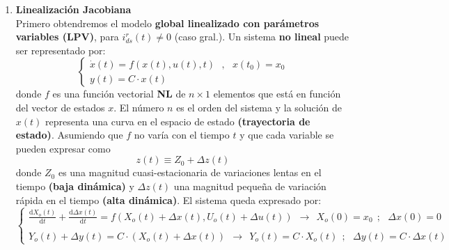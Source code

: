 \documentclass[10pt]{article}
\begin{document}
\begin{enumerate}
	\item \textbf{Linealización Jacobiana}
    \vspace{0.3cm} 
    \\Primero obtendremos el modelo \textbf{global linealizado con parámetros variables (LPV)}, para $ i_{ds}^{r}\left( t \right ) \neq 0 $ (caso gral.). 
    Un sistema \textbf{no lineal} puede ser representado por:
    \begin{equation}
		\begin{cases}
			\dot{x}\left ( t \right )= f\left ( x\left ( t \right ),u\left ( t \right ),t \right ) \ \ \ ,\ \ \ x\left ( t_{0} \right )=x_{0}
			\\
			y\left ( t \right )= C \cdot x\left ( t \right )
		\end{cases}
    \end{equation}
    donde $f$ es una función vectorial \textbf{NL} de $n\times 1$ elementos que está en función del vector de estados $x$.
    El número $n$ es el orden del sistema y la solución de $x(t)$ representa una curva en el espacio de estado \textbf{(trayectoria de estado)}.
    Asumiendo que $f$ no varía con el tiempo $t$ y  que cada variable se pueden expresar como
    \begin{equation}
        z\left ( t \right )\equiv Z_{0} + \Delta z\left ( t \right )
    \end{equation}
    donde $Z_{0}$ es una magnitud cuasi-estacionaria de variaciones lentas en el tiempo \textbf{(baja dinámica)} y $\Delta z(t)$ una magnitud pequeña de variación rápida en el tiempo \textbf{(alta dinámica)}.
    El sistema queda expresado por:
    \begin{equation}
        \begin{cases}
            \frac{\mathrm{d} X_{o}\left ( t \right )}{\mathrm{d} t}+
            \frac{\mathrm{d} \Delta x\left ( t \right )}{\mathrm{d} t}
            =
            f\left ( X_{o}\left ( t \right )+\Delta x\left ( t \right ),U_{o}\left ( t \right )+\Delta u\left ( t \right ) \right )
            \ \ \rightarrow \ \ 
            X_{o}\left ( 0 \right )=x_{0}\ \ ;\ \ \ \Delta x\left ( 0 \right )=0
			\\
			\\
			Y_{o}(t)+\Delta y(t)=C\cdot (X_{o}\left ( t \right )+\Delta x\left ( t \right ))
			\ \ \rightarrow \ \ 
			Y_{o}\left ( t \right )=C\cdot X_{o}(t)\ \ ;\ \ \ \Delta y\left ( t \right )=C\cdot \Delta x\left ( t \right )
        \end{cases}
    \end{equation}

\end{enumerate}
\end{document}
